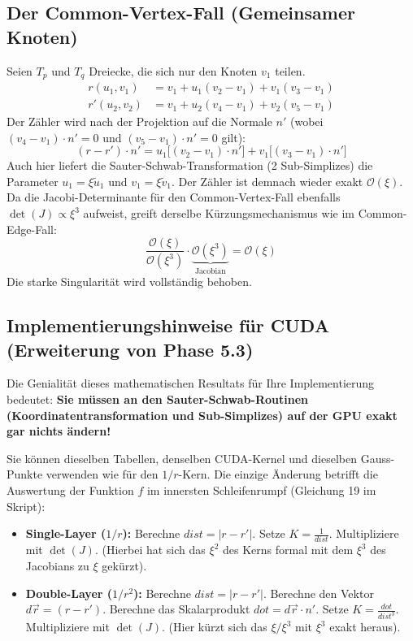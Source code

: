 \documentclass[11pt,a4paper]{article}
\begin{document}
\subsection{Der Common-Vertex-Fall (Gemeinsamer Knoten)}

Seien $T_p$ und $T_q$ Dreiecke, die sich nur den Knoten $v_1$ teilen.
\begin{align}
    r(u_1, v_1) &= v_1 + u_1(v_2 - v_1) + v_1(v_3 - v_1) \\
    r'(u_2, v_2) &= v_1 + u_2(v_4 - v_1) + v_2(v_5 - v_1)
\end{align}
Der Zähler wird nach der Projektion auf die Normale $n'$ (wobei $(v_4-v_1)\cdot n'=0$ und $(v_5-v_1)\cdot n'=0$ gilt):
\begin{equation}
    (r - r') \cdot n' = u_1 \big[ (v_2 - v_1) \cdot n' \big] + v_1 \big[ (v_3 - v_1) \cdot n' \big]
\end{equation}
Auch hier liefert die Sauter-Schwab-Transformation (2 Sub-Simplizes) die Parameter $u_1 = \xi \tilde{u}_1$ und $v_1 = \xi \tilde{v}_1$. Der Zähler ist demnach wieder exakt $\mathcal{O}(\xi)$.
Da die Jacobi-Determinante für den Common-Vertex-Fall ebenfalls $\det(J) \propto \xi^3$ aufweist, greift derselbe Kürzungsmechanismus wie im Common-Edge-Fall:
\begin{equation}
    \frac{\mathcal{O}(\xi)}{\mathcal{O}(\xi^3)} \cdot \underbrace{\mathcal{O}(\xi^3)}_{\text{Jacobian}} = \mathcal{O}(\xi)
\end{equation}
Die starke Singularität wird vollständig behoben.

\subsection{Implementierungshinweise für CUDA (Erweiterung von Phase 5.3)}

Die Genialität dieses mathematischen Resultats für Ihre Implementierung bedeutet: \textbf{Sie müssen an den Sauter-Schwab-Routinen (Koordinatentransformation und Sub-Simplizes) auf der GPU exakt gar nichts ändern!}

Sie können dieselben Tabellen, denselben CUDA-Kernel und dieselben Gauss-Punkte verwenden wie für den $1/r$-Kern. Die einzige Änderung betrifft die Auswertung der Funktion $f$ im innersten Schleifenrumpf (Gleichung 19 im Skript):
\begin{itemize}
    \item \textbf{Single-Layer ($1/r$):} Berechne $dist = |r - r'|$. Setze $K = \frac{1}{dist}$. Multipliziere mit $\det(J)$. (Hierbei hat sich das $\xi^2$ des Kerns formal mit dem $\xi^3$ des Jacobians zu $\xi$ gekürzt).
    \item \textbf{Double-Layer ($1/r^2$):} Berechne $dist = |r - r'|$. Berechne den Vektor $d\vec{r} = (r - r')$. Berechne das Skalarprodukt $dot = d\vec{r} \cdot n'$. Setze $K = \frac{dot}{dist^3}$. Multipliziere mit $\det(J)$. (Hier kürzt sich das $\xi/\xi^3$ mit $\xi^3$ exakt heraus).
\end{itemize}
\end{document}
